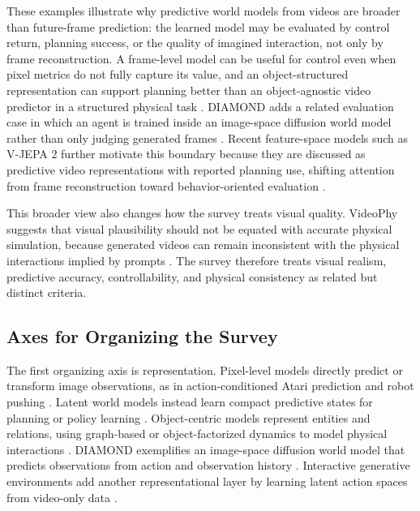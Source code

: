 These examples illustrate why predictive world models from videos are broader than future-frame prediction: the learned model may be evaluated by control return, planning success, or the quality of imagined interaction, not only by frame reconstruction. A frame-level model can be useful for control even when pixel metrics do not fully capture its value, and an object-structured representation can support planning better than an object-agnostic video predictor in a structured physical task \cite{oh2015_action_conditional_video_prediction_prov,janner2019_o2p2_prov}. DIAMOND adds a related evaluation case in which an agent is trained inside an image-space diffusion world model rather than only judging generated frames \cite{alonso2024_diamond_prov}.
Recent feature-space models such as V-JEPA 2 further motivate this boundary because they are discussed as predictive video representations with reported planning use, shifting attention from frame reconstruction toward behavior-oriented evaluation \cite{assran2025vjepa2_prov}.

This broader view also changes how the survey treats visual quality. VideoPhy suggests that visual plausibility should not be equated with accurate physical simulation, because generated videos can remain inconsistent with the physical interactions implied by prompts \cite{bansal2025_videophy_prov}. The survey therefore treats visual realism, predictive accuracy, controllability, and physical consistency as related but distinct criteria.

\subsection{Axes for Organizing the Survey}

The first organizing axis is representation. Pixel-level models directly predict or transform image observations, as in action-conditioned Atari prediction and robot pushing \cite{oh2015_action_conditional_video_prediction_prov,finn2016_physical_interaction_video_prediction_prov}. Latent world models instead learn compact predictive states for planning or policy learning \cite{ha2018_world_models_prov,hafner2019_planet_prov,hafner2020_dreamer_prov}. Object-centric models represent entities and relations, using graph-based or object-factorized dynamics to model physical interactions \cite{battaglia2016_interaction_networks_prov,watters2017_visual_interaction_networks_prov,janner2019_o2p2_prov}. DIAMOND exemplifies an image-space diffusion world model that predicts observations from action and observation history \cite{alonso2024_diamond_prov}. Interactive generative environments add another representational layer by learning latent action spaces from video-only data \cite{bruce2024_genie_prov}.

